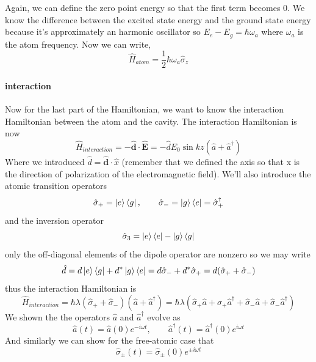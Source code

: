 \documentclass[english, a4paper, 12pt, twoside]{article}
\numberwithin{equation}{section} %
\begin{document}
Again, we can define the zero point energy so that the first term becomes $0$. We know the difference between the excited state energy and the ground state energy because it's approximately an harmonic oscillator so $E_e - E_g = \hbar\omega_a$ where $\omega_a$ is the atom frequency. Now we can write,
\begin{equation}
    \boxed{\hat{H}_{atom} = \frac{1}{2}\hbar\omega_a\hat{\sigma}_z}
\end{equation}

\paragraph*{interaction}

Now for the last part of the Hamiltonian, we want to know the interaction Hamiltonian between the atom and the cavity. The interaction Hamiltonian is now 
\[
\hat{H}_{interaction} = -\hat{\textbf{d}}\cdot\hat{\textbf{E}} = -\hat{d} E_0 \sin{kz} (\hat{a} + \hat{a}^\dag{})
\]
Where we introduced $\hat{d} = \hat{\textbf{d}} \cdot \hat{x}$ (remember that we defined the axis so that x is the direction of polarization of the electromagnetic field).
We'll also introduce the atomic transition operators
\[
    \hat{\sigma}_+ = \ket{e}\bra{g}, \quad\quad \hat{\sigma}_- = \ket{g}\bra{e} = \hat{\sigma}_+^{\dag{}}
\]
and the inversion operator
\[
\hat{\sigma}_3 = \ket{e}\bra{e} - \ket{g}\bra{g}
\]
only the off-diagonal elements of the dipole operator are nonzero so we may write
\[
    \hat{d} = d\ket{e}\bra{g} + d^* \ket{g}\bra{e} = d\hat{\sigma}_- + d^* \hat{\sigma}_+ = d(\hat{\sigma}_+ + \hat{\sigma}_-)
\]
thus the interaction Hamiltonian is
\begin{equation}
    \hat{H}_{interaction} = \hbar\lambda(\hat{\sigma}_+ + \hat{\sigma}_-)(\hat{a} +  \hat{a}^\dag) 
    = \hbar\lambda(\hat{\sigma}_+\hat{a} + \hat{\sigma}_+\hat{a}^\dag + \hat{\sigma}_-\hat{a} + \hat{\sigma}_-\hat{a}^\dag) 
\end{equation}
We shown the the operators $\hat{a}$ and $\hat{a}^\dag{}$ evolve as
\begin{equation}
    \hat{a}(t) = \hat{a}(0)e^{-i\omega t}, \quad\quad \hat{a}^\dag{}(t) = \hat{a}^\dag{}(0)e^{i\omega t}
\end{equation}
And similarly we can show for the free-atomic case that
\begin{equation}
    \hat{\sigma}_{\pm}(t) =   \hat{\sigma}_{\pm}(0)e^{\pm i\omega t}
\end{equation}
\end{document}
